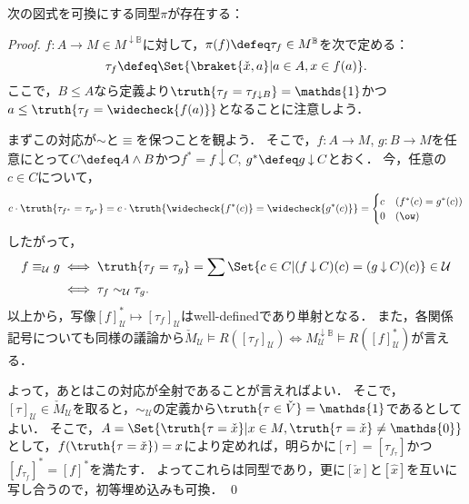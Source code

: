 \documentclass[a4j]{ltjsarticle}
\newcommand{\spanning}{\mathop{\downarrow}}
\newcommand{\reduce}{\mathbin{\downarrow}}
\begin{document}
\begin{theorem}
 次の図式を可換にする同型$\pi$が存在する：
 \begin{center}
 \end{center}
\end{theorem}
\begin{proof}
 $f: A \to M \in M^{\spanning \mathbb{B}}$に対して，$\pi(f) \defeq \tau_f \in M^{\mathbb B}$を次で定める：
 \[
  \tau_f \defeq \Set{ \braket{\check{x}, a} | a \in A, x \in f(a) }.
 \]
 ここで，$B \leq A$なら定義より$\truth{\tau_f = \tau_{f \reduce B}} = \mathds{1}$かつ$a \leq \truth{\tau_f = \widecheck{f(a)}}$となることに注意しよう．

 まずこの対応が$\sim$と$\equiv$を保つことを観よう．
 そこで，$f : A \to M$, $g: B \to M$を任意にとって$C \defeq A \wedge B$かつ$f^* = f \reduce C$, $g^* \defeq g \reduce C$とおく．
 今，任意の$c \in C$について，
 \begin{align*}
  c \cdot \truth{\tau_{f^*} = \tau_{g^*}} = c \cdot \truth{\widecheck{f^*(c)} = \widecheck{g^*(c)}} =
  \begin{cases}
   c & (f^*(c) = g^*(c))\\
   0 & (\ow) 
  \end{cases}
 \end{align*}
 したがって，
 \begin{align*}
  f \equiv_\mathcal{U} g
  &\iff \truth{\tau_f = \tau_g} = \sum \Set{c \in C | (f \reduce C)(c) = (g \reduce C)(c)} \in \mathcal{U}\\
  &\iff \tau_f \sim_{\mathcal{U}}  \tau_g.
 \end{align*}
 以上から，写像$[f]^*_{\mathcal{U}} \mapsto [\tau_f]_{\mathcal{U}}$はwell-definedであり単射となる．
 また，各関係記号についても同様の議論から$\check{M}_{\mathcal{U}} \models R([\tau_f]_{\mathcal{U}}) \iff M^{\spanning \mathbb{B}}_\mathcal{U} \models R([f]^*_{\mathcal{U}})$が言える．

 よって，あとはこの対応が全射であることが言えればよい．
 そこで，$[\tau]_\mathcal{U} \in \check{M}_\mathcal{U}$を取ると，$\sim_{\mathcal{U}}$の定義から$\truth{\tau \in \check{V}} = \mathds{1}$であるとしてよい．
 そこで，$A = \Set{\truth{\tau = \check{x}} | x \in M, \truth{\tau = \check{x}} \neq \mathds{0}}$として，$f(\truth{\tau = \check{x}}) = x$により定めれば，明らかに$[\tau] = [\tau_{f_\tau}]$かつ$[f_{\tau_f}]^* = [f]^*$を満たす．
 よってこれらは同型であり，更に$[\check{x}]$と$[\hat{x}]$を互いに写し合うので，初等埋め込みも可換． \qed
\end{proof}
\end{document}
